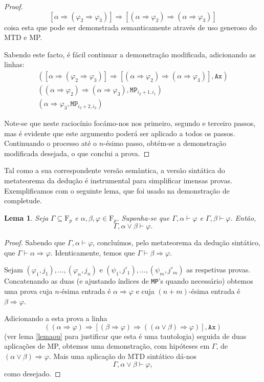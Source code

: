 \documentclass{report}
\newtheorem{lema}{Lema}
\theoremstyle{definition}
\theoremstyle{remark}
\newcommand{\F}{\mathrm{F}}
\newcommand{\imply}{\mathbin{\Rightarrow}}
\begin{document}
\begin{proof}
	\[[\alpha \imply (\varphi_2 \imply \varphi_3)] \imply [(\alpha \imply \varphi_2) \imply (\alpha \imply \varphi_3)]\]
	coisa esta que pode ser demonstrada semanticamente através de uso generoso do MTD e MP.
	
	Sabendo este facto, é fácil continuar a demonstração modificada, adicionando as linhas:
	\begin{gather*}
	([\alpha \imply (\varphi_2 \imply \varphi_3)] \imply [(\alpha \imply \varphi_2) \imply (\alpha \imply \varphi_3)], \texttt{Ax})\\
	((\alpha \imply \varphi_2) \imply (\alpha \imply \varphi_3), \texttt{MP}_{i_2 + 1, i_1})\\
	(\alpha \imply \varphi_3, \texttt{MP}_{i_2 + 2, i_2})
	\end{gather*}
	
	Note-se que neste raciocínio focámo-nos nos primeiro, segundo e terceiro passos, mas é evidente que este argumento poderá ser aplicado a todos os passos. Continuando o processo até o $n$-ésimo passo, obtém-se a demonstração modificada desejada, o que conclui a prova.
	\end{proof}
	
	Tal como a sua correspondente versão semântica, a versão sintática do metateorema da dedução é instrumental para simplificar imensas provas. Exemplificamos com o seguinte lema, que foi usado na demonstração de completude.
	
	\begin{lema}\label{lema:1}
	Seja $\Gamma \subseteq \F_p$ e $\alpha, \beta, \varphi \in \F_p$. Suponha-se que $\Gamma, \alpha \vdash \varphi$ e $\Gamma, \beta \vdash \varphi$. Então,
	\[\Gamma, \alpha \lor \beta \vdash \varphi.\]
	\end{lema}
	
	\begin{proof}
	Sabendo que $\Gamma, \alpha \vdash \varphi$, concluímos, pelo metateorema da dedução sintático, que $\Gamma \vdash \alpha \imply \varphi$. Identicamente, temos que $\Gamma \vdash \beta \imply \varphi$.
	
	Sejam $(\varphi_1, j_1), \dots, (\varphi_n, j_n)$ e $(\psi_1, j'_1), \dots, (\psi_m, j'_m)$ as respetivas provas. Concatenando as duas (e ajustando índices de \texttt{MP}'s quando necessário) obtemos uma prova cuja $n$-ésima entrada é $\alpha \imply \varphi$ e cuja $(n+m)$-ésima entrada é $\beta \imply \varphi$.
	
	Adicionando a esta prova a linha
	\[((\alpha \imply \varphi) \imply [(\beta \imply \varphi) \imply ((\alpha \lor \beta) \imply \varphi)], \texttt{Ax})\]
	(ver lema \ref{lemaou} para justificar que esta é uma tautologia) seguida de duas aplicações de MP, obtemos uma demonstração, com hipóteses em $\Gamma$, de $(\alpha \lor \beta) \imply \varphi$. Mais uma aplicação do MTD sintático dá-nos
	\[\Gamma, \alpha \lor \beta \vdash \varphi,\]
	como desejado.
	\end{proof}
	
\end{document}
